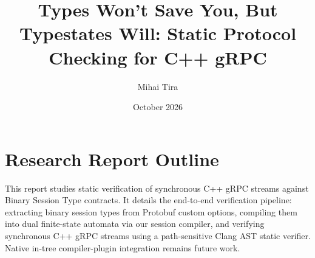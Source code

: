 \documentclass[11pt,a4paper]{article}
\title{Types Won't Save You, But Typestates Will: Static Protocol\\
Checking for C++ gRPC}
\author{Mihai Tira}
\date{October 2026}
\begin{document}
\maketitle

\section{Research Report Outline}

This report studies static verification of synchronous C++ gRPC streams against Binary Session Type contracts. It details the end-to-end verification pipeline: extracting binary session types from Protobuf custom options, compiling them into dual finite-state automata via our session compiler, and verifying synchronous C++ gRPC streams using a path-sensitive Clang AST static verifier. Native in-tree compiler-plugin integration remains future work.
\end{document}
